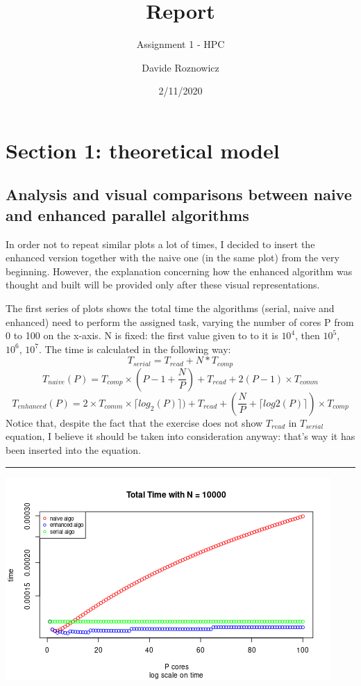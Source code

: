 \documentclass[
  10pt,
]{article}
\title{Report}
\subtitle{Assignment 1 - HPC}
\author{Davide Roznowicz}
\date{2/11/2020}
\begin{document}
\maketitle

{
\setcounter{tocdepth}{2}
\tableofcontents
}
\hypertarget{section-1-theoretical-model}{%
\section{Section 1: theoretical
model}\label{section-1-theoretical-model}}

\hypertarget{analysis-and-visual-comparisons-between-naive-and-enhanced-parallel-algorithms}{%
\subsection{Analysis and visual comparisons between naive and enhanced
parallel
algorithms}\label{analysis-and-visual-comparisons-between-naive-and-enhanced-parallel-algorithms}}

In order not to repeat similar plots a lot of times, I decided to insert
the enhanced version together with the naive one (in the same plot) from
the very beginning. However, the explanation concerning how the enhanced
algorithm was thought and built will be provided only after these visual
representations.

The first series of plots shows the total time the algorithms (serial,
naive and enhanced) need to perform the assigned task, varying the
number of cores P from 0 to 100 on the x-axis. N is fixed: the first
value given to to it is \(10^{4}\), then \(10^{5}\), \(10^{6}\),
\(10^{7}\). The time is calculated in the following way:
\[T_{serial}= T_{read} + N*T_{comp}\]
\[T_{naive}(P)= T_{comp}\times (P -1 + \frac{N}{P}) + T_{read} + 2(P-1)\times T_{comm}\]
\[T_{enhanced}(P)= 2\times T_{comm}\times \lceil{log_2(P)}\rceil)+T_{read}+(\frac{N}{P}+\lceil{log2(P)}\rceil)\times T_{comp}\]
Notice that, despite the fact that the exercise does not show
\(T_{read}\) in \(T_{serial}\) equation, I believe it should be taken
into consideration anyway: that's way it has been inserted into the
equation.

\begin{center}\rule{0.5\linewidth}{0.5pt}\end{center}

\begin{center}\includegraphics{figs/time_plots_naive_&_enhanced-1} \end{center}
\end{document}
